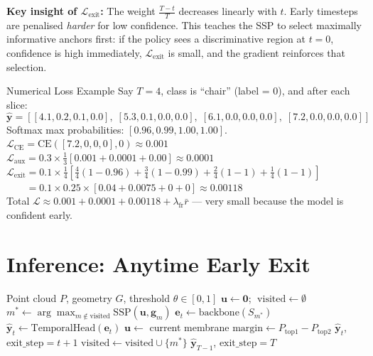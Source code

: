 \documentclass[11pt,a4paper]{article}
\begin{document}
\textbf{Key insight of $\mathcal{L}_\text{exit}$:}  The weight $\frac{T-t}{T}$
decreases linearly with $t$.  Early timesteps are penalised \emph{harder} for
low confidence.  This teaches the SSP to select maximally informative anchors
first: if the policy sees a discriminative region at $t=0$, confidence is high
immediately, $\mathcal{L}_\text{exit}$ is small, and the gradient reinforces
that selection.

\begin{examplebox}{Numerical Loss Example}
Say $T=4$, class is ``chair'' (label = 0), and after each slice:
\[
  \hat{\mathbf{y}} = [[4.1, 0.2, 0.1, 0.0],\; [5.3, 0.1, 0.0, 0.0],\;
                      [6.1, 0.0, 0.0, 0.0],\; [7.2, 0.0, 0.0, 0.0]]
\]
Softmax max probabilities: $[0.96, 0.99, 1.00, 1.00]$.\\[4pt]
$\mathcal{L}_\text{CE} = \text{CE}([7.2, 0, 0, 0], 0) \approx 0.001$\\
$\mathcal{L}_\text{aux} = 0.3 \times \frac{1}{3}[0.001 + 0.0001 + 0.00] \approx 0.0001$\\
$\mathcal{L}_\text{exit} = 0.1 \times \frac{1}{4}[\frac{4}{4}(1{-}0.96) + \frac{3}{4}(1{-}0.99) + \frac{2}{4}(1{-}1) + \frac{1}{4}(1{-}1)]$\\
$\phantom{\mathcal{L}_\text{exit}} = 0.1 \times 0.25 \times [0.04 + 0.0075 + 0 + 0] \approx 0.00118$\\[4pt]
Total $\mathcal{L} \approx 0.001 + 0.0001 + 0.00118 + \lambda_\text{fr} \bar{r}$ — very small because the model is confident early.
\end{examplebox}

\section{Inference: Anytime Early Exit}

\begin{algorithm}[H]
\caption{ASP Anytime Inference}
\begin{algorithmic}[1]
\Require Point cloud $P$, geometry $G$, threshold $\theta \in [0,1]$
\State $\mathbf{u} \leftarrow \mathbf{0}$; $\;\text{visited} \leftarrow \emptyset$
  \State $m^* \leftarrow \arg\max_{m \notin \text{visited}} \text{SSP}(\mathbf{u}, \mathbf{g}_m)$
  \State $\mathbf{e}_t \leftarrow \text{backbone}(S_{m^*})$
  \State $\hat{\mathbf{y}}_t \leftarrow \text{TemporalHead}(\mathbf{e}_t)$
  \State $\mathbf{u} \leftarrow$ current membrane
  \State $\text{margin} \leftarrow P_{\text{top1}} - P_{\text{top2}}$
    \Return $\hat{\mathbf{y}}_t$, $\text{exit\_step} = t+1$
  \EndIf
  \State $\text{visited} \leftarrow \text{visited} \cup \{m^*\}$
\EndFor
\Return $\hat{\mathbf{y}}_{T-1}$, $\text{exit\_step} = T$
\end{algorithmic}
\end{algorithm}
\end{document}
